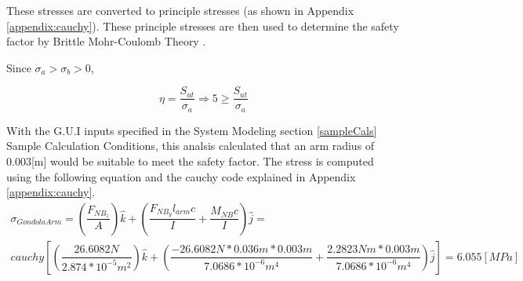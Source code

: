 \documentclass[../main.tex]{subfiles}
\begin{document}
These stresses are converted to principle stresses (as shown in Appendix \ref{appendix:cauchy}). These principle stresses are then used to determine the safety factor by Brittle Mohr-Coulomb Theory \cite[227]{shigley}.

Since $\sigma _a > \sigma _b > 0$,

\begin{equation}
	\eta = \dfrac{S_{ut}}{\sigma _a} \Rightarrow 5 \geq \dfrac{S_{ut}}{\sigma _a}
\end{equation}

With the G.U.I inputs specified in the System Modeling section \ref{sampleCals} Sample Calculation Conditions, this analsis calculated that an arm radius of 0.003[m] would be suitable to meet the safety factor. The stress is computed using the following equation and the cauchy code explained in Appendix \ref{appendix:cauchy}.
\begin{multline}
\sigma _{Gondola Arm}  = \left(\dfrac{F_{NB_{z}}}{A}\right)\hat{k} + \left(\dfrac{F_{NB_{y}}l_{arm}c}{I}  + \dfrac{M_{NB}c}{I} \right) \hat{j} = \\ cauchy\left[\left(\dfrac{26.6082N}{2.874*10^{-5}m^2}\right)\hat{k} + \left(\dfrac{-26.6082N*0.036m*0.003m}{7.0686*10^{-6}m^4}  + \dfrac{2.2823Nm*0.003m}{7.0686*10^{-6}m^4} \right) \hat{j}\right] = 6.055 [MPa] 
\end{multline} 
\end{document}
